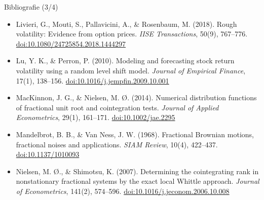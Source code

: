 \begin{frame}{Bibliografie (3/4)}
\begin{itemize}
    \item Livieri, G., Mouti, S., Pallavicini, A., \& Rosenbaum, M. (2018). Rough volatility: Evidence from option prices. \textit{IISE Transactions}, 50(9), 767--776. \href{https://doi.org/10.1080/24725854.2018.1444297}{doi:10.1080/24725854.2018.1444297}
    \item Lu, Y. K., \& Perron, P. (2010). Modeling and forecasting stock return volatility using a random level shift model. \textit{Journal of Empirical Finance}, 17(1), 138--156. \href{https://doi.org/10.1016/j.jempfin.2009.10.001}{doi:10.1016/j.jempfin.2009.10.001}
    \item MacKinnon, J. G., \& Nielsen, M. Ø. (2014). Numerical distribution functions of fractional unit root and cointegration tests. \textit{Journal of Applied Econometrics}, 29(1), 161--171. \href{https://doi.org/10.1002/jae.2295}{doi:10.1002/jae.2295}
    \item Mandelbrot, B. B., \& Van Ness, J. W. (1968). Fractional Brownian motions, fractional noises and applications. \textit{SIAM Review}, 10(4), 422--437. \href{https://doi.org/10.1137/1010093}{doi:10.1137/1010093}
    \item Nielsen, M. Ø., \& Shimotsu, K. (2007). Determining the cointegrating rank in nonstationary fractional systems by the exact local Whittle approach. \textit{Journal of Econometrics}, 141(2), 574--596. \href{https://doi.org/10.1016/j.jeconom.2006.10.008}{doi:10.1016/j.jeconom.2006.10.008}
\end{itemize}
\end{frame}


